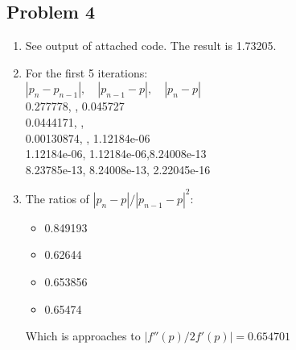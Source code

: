 \documentclass{article}
\begin{document}
\subsection*{{Problem 4}}
\label{}
\begin{enumerate}
\item 
See output of attached code.  The result is 1.73205. 
\item 
For the first 5 iterations: \\
 $|p_n-p_{n-1}|, \quad    |p_{n-1}-p|,   \quad  |p_n-p|  $\\
0.277778,  ,   0.045727\\
0.0444171, ,  \\
0.00130874, , \quad	1.12184e-06\\
1.12184e-06, \quad	1.12184e-06,\quad 8.24008e-13\\
8.23785e-13, \quad	 8.24008e-13, \quad   2.22045e-16\\
\item 
The ratios of $|p_n-p|/|p_{n-1}-p|^2$: \\
\begin{itemize}
\item 0.849193\\
\item 0.62644\\
\item 0.653856\\
\item 0.65474\\
\end{itemize}
Which is approaches to $|f''(p)/2f'(p)|=0.654701 $
\end{enumerate}


\hypertarget{problem_5_homework_checklist_2}{}
\end{document}
